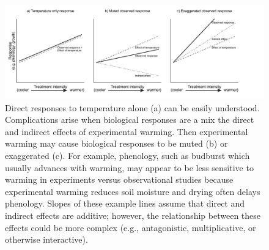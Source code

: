 \documentclass{article}
\begin{document}
 \clearpage
 \begin{figure}[h]
 \includegraphics{../Analyses/figures/DirIndWarmingEffects.pdf} 
 \caption{Direct responses to temperature alone (a) can be easily understood. Complications arise when biological responses are a mix the direct and indirect effects of experimental warming. Then experimental warming may cause biological responses to be muted (b) or exaggerated (c). For example, phenology, such as budburst which usually advances with warming, may appear to be less sensitive to warming in experiments versus observational studies \citep{wolkovich2012} because experimental warming reduces soil moisture and drying often delays phenology. Slopes of these example lines assume that direct and indirect effects are additive; however, the relationship between these effects could be more complex (e.g., antagonistic, multiplicative, or otherwise interactive).} 
 
\label{fig:biolimp}
  \end{figure}
\end{document}

